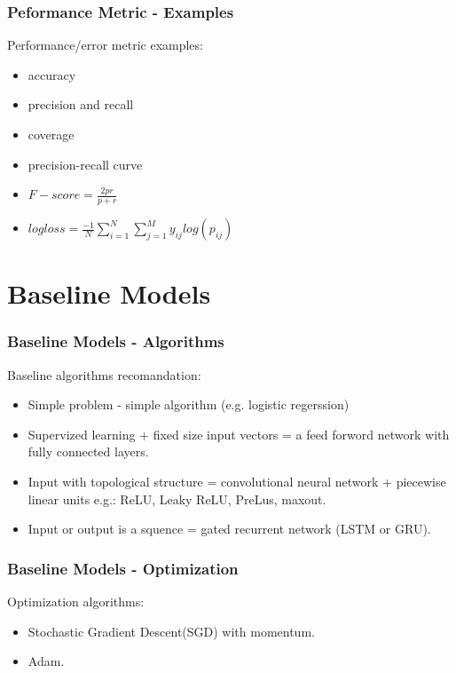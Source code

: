 \documentclass{beamer}
\begin{document}
\begin{frame}
    \frametitle{Peformance Metric - Examples}
    Performance/error metric examples:
    \begin{itemize}
       \item accuracy
       \item precision and recall
       \item coverage
       \item precision-recall curve
       \item $F-score = \frac{2pr}{p+r}$
       \item $logloss = \frac{-1}{N} $$\sum_{i=1}^{N}$$ $$\sum_{j=1}^{M}$$
           y_{ij}log(p_{ij})$
    \end{itemize}
\end{frame}

\section{Baseline Models}\label{sec:baseline-model}
\begin{frame}
    \frametitle{Baseline Models - Algorithms}
    Baseline algorithms recomandation:
    \begin{itemize}
        \item Simple problem - simple algorithm (e.g. logistic regerssion)
        \item Supervized learning + fixed size input vectors = a feed forword
            network with fully connected layers.
        \item Input with topological structure = convolutional neural network +
            piecewise linear units e.g.: ReLU, Leaky ReLU, PreLus, maxout.
        \item Input or output is a squence = gated recurrent network (LSTM or GRU).
    \end{itemize}
\end{frame}

\begin{frame}
    \frametitle{Baseline Models - Optimization}
    Optimization algorithms:
    \begin{itemize}
        \item Stochastic Gradient Descent(SGD) with momentum.
        \item Adam.\cite{DBLP:journals/corr/KingmaB14}
    \end{itemize}
\end{frame}
\end{document}

